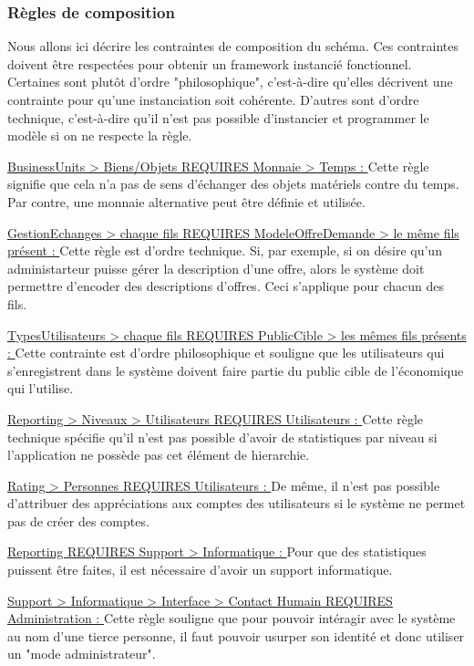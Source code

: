 \subsubsection{Règles de composition}

Nous allons ici décrire les contraintes de composition du schéma.   Ces contraintes doivent être respectées pour obtenir un framework instancié fonctionnel.  Certaines sont plutôt d'ordre "philosophique",  c'est-à-dire qu'elles décrivent une contrainte pour qu'une instanciation soit cohérente.  D'autres sont d'ordre technique,  c'est-à-dire qu'il n'est pas possible d'instancier et programmer le modèle si on ne respecte la règle.

\underline{BusinessUnits > Biens/Objets REQUIRES Monnaie > Temps : }  Cette règle  signifie que cela n'a pas de sens d'échanger des objets matériels contre du temps.  Par contre,  une monnaie alternative peut être définie et utilisée.

\underline{GestionEchanges > chaque fils REQUIRES ModeleOffreDemande > le même fils présent : }  Cette règle est d'ordre technique.  Si,  par exemple,  si on désire qu'un administarteur puisse gérer la description d'une offre,  alors le système doit permettre d'encoder des descriptions d'offres.  Ceci s'applique pour chacun des fils. 

\underline{TypesUtilisateurs > chaque fils REQUIRES PublicCible > les mêmes fils présents : }  Cette contrainte est d'ordre philosophique et souligne que les utilisateurs qui s'enregistrent dans le système doivent faire partie du public cible de l'économique qui l'utilise.

\underline{Reporting > Niveaux > Utilisateurs REQUIRES Utilisateurs : }  Cette règle technique spécifie qu'il n'est pas possible d'avoir de statistiques par niveau si l'application ne possède pas cet élément de  hierarchie.

\underline{Rating > Personnes REQUIRES Utilisateurs : }  De même,  il n'est pas possible d'attribuer des appréciations aux comptes des utilisateurs si le système ne permet pas de créer des comptes.

\underline{Reporting REQUIRES Support > Informatique : } Pour que des statistiques puissent être faites,  il est nécessaire d'avoir un support informatique.  

\underline{Support > Informatique > Interface > Contact Humain REQUIRES Administration : }  Cette règle souligne que pour pouvoir intéragir avec le système au nom d'une tierce personne,  il faut pouvoir usurper son identité et donc utiliser un "mode administrateur".  

